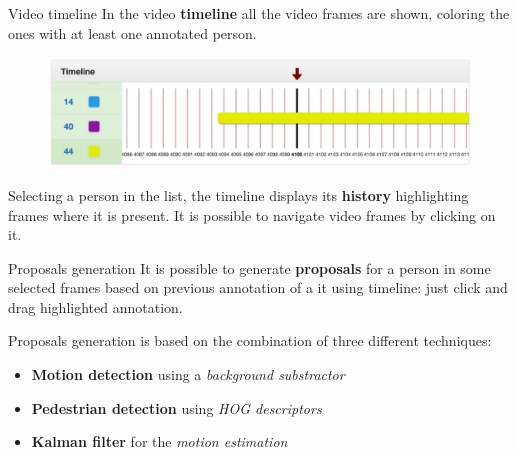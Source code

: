 \documentclass{beamer}
\begin{document}
\begin{tframe}{Video timeline}
In the video \textbf{timeline} all the video frames are shown, coloring the ones with at least one annotated person. 
\vspace{0.2cm}
\begin{figure}[h]
\centering
\includegraphics[scale=0.22]{images/timeline.jpg}
\end{figure}
\vspace{0.2cm}
Selecting a person in the list, the timeline displays its \textbf{history} highlighting frames where it is present. It is possible to navigate video frames by clicking on it.
\end{tframe}

\begin{tframe}{Proposals generation}
It is possible to generate \textbf{proposals} for a person in some selected frames based on previous  annotation of a it using timeline: just click and drag highlighted annotation.

\vspace{0.3cm}

Proposals generation is based on the combination of three different techniques:
\vspace{0.4cm}
\begin{itemize}
\item \textbf{Motion detection} using a \emph{background substractor}
\vspace{0.2cm}
\item \textbf{Pedestrian detection} using \emph{HOG descriptors}
\vspace{0.2cm}
\item \textbf{Kalman filter} for the \emph{motion estimation}
\end{itemize}
\end{tframe}
\end{document}
